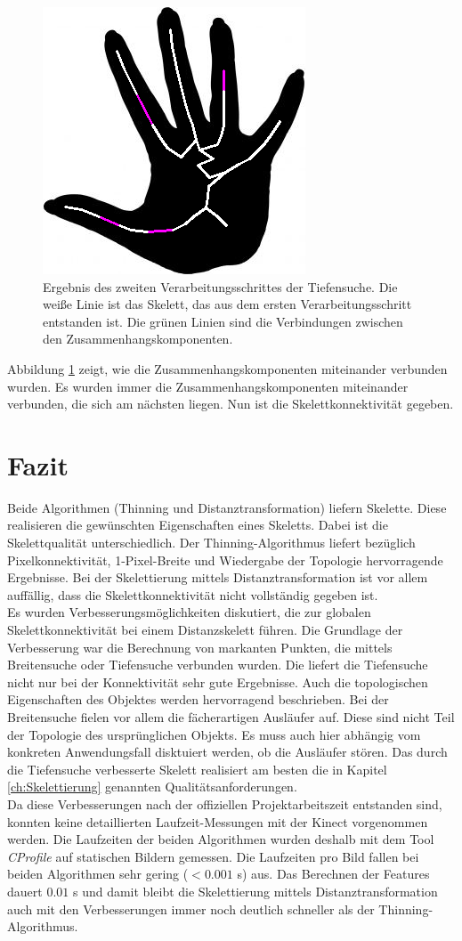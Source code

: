 \FloatBarrier
\begin{figure}[h]
\centering
\includegraphics[width=0.4\linewidth]{./fig/dfs-endergebnis-hand2.png}
\caption{Ergebnis des zweiten Verarbeitungsschrittes der Tiefensuche. Die weiße Linie ist das Skelett,
das aus dem ersten Verarbeitungsschritt entstanden ist. Die grünen
Linien sind die Verbindungen zwischen den Zusammenhangskomponenten.}
\label{fig:hand-DFS-endergebnis}
\end{figure}
\FloatBarrier
\noindent
Abbildung \ref{fig:hand-DFS-endergebnis} zeigt, wie die Zusammenhangskomponenten miteinander verbunden
wurden. Es wurden immer die Zusammenhangskomponenten miteinander verbunden, die sich am nächsten liegen.
Nun ist die Skelettkonnektivität gegeben.
\section{Fazit}
Beide Algorithmen (Thinning und Distanztransformation) liefern 
Skelette. Diese realisieren die gewünschten Eigenschaften eines
Skeletts. Dabei ist die Skelettqualität unterschiedlich. Der
Thinning-Algorithmus liefert bezüglich Pixelkonnektivität, 
1-Pixel-Breite und Wiedergabe der Topologie hervorragende Ergebnisse. Bei der Skelettierung mittels Distanztransformation
ist vor allem auffällig, dass die Skelettkonnektivität nicht vollständig gegeben ist. \\
Es wurden Verbesserungsmöglichkeiten diskutiert, die zur globalen Skelettkonnektivität bei einem Distanzskelett führen. Die Grundlage der
Verbesserung war die Berechnung von markanten Punkten, die mittels Breitensuche oder Tiefensuche verbunden wurden. Die
liefert die Tiefensuche nicht nur bei der Konnektivität sehr gute Ergebnisse. Auch die topologischen Eigenschaften des Objektes werden
hervorragend beschrieben. Bei der Breitensuche fielen vor allem die fächerartigen Ausläufer auf. Diese sind nicht Teil der Topologie
des ursprünglichen Objekts. Es muss auch hier abhängig vom konkreten Anwendungsfall disktuiert werden, ob die Ausläufer stören. Das durch die Tiefensuche verbesserte Skelett realisiert am besten die in Kapitel \ref{ch:Skelettierung} genannten Qualitätsanforderungen.\\ Da diese Verbesserungen nach der offiziellen Projektarbeitszeit entstanden sind, konnten keine detaillierten Laufzeit-Messungen mit der Kinect vorgenommen werden. Die Laufzeiten
der beiden Algorithmen wurden deshalb mit dem Tool \emph{CProfile} auf statischen Bildern gemessen. Die Laufzeiten pro Bild fallen bei beiden Algorithmen sehr gering ($<0.001$ s) aus. Das Berechnen der Features dauert $0.01$ s und damit bleibt die Skelettierung mittels Distanztransformation auch mit den Verbesserungen immer noch deutlich schneller als der Thinning-Algorithmus.